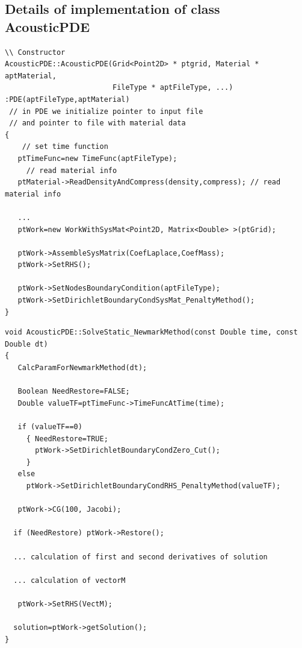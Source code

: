 \subsection { Details of implementation of class AcousticPDE}
\hrulefill
\begin{small}
\begin{verbatim}
\\ Constructor
AcousticPDE::AcousticPDE(Grid<Point2D> * ptgrid, Material * aptMaterial,
                         FileType * aptFileType, ...)
:PDE(aptFileType,aptMaterial)
 // in PDE we initialize pointer to input file
 // and pointer to file with material data
{
    // set time function 
   ptTimeFunc=new TimeFunc(aptFileType); 
     // read material info
   ptMaterial->ReadDensityAndCompress(density,compress); // read material info
   
   ...
   ptWork=new WorkWithSysMat<Point2D, Matrix<Double> >(ptGrid);
 
   ptWork->AssembleSysMatrix(CoefLaplace,CoefMass);
   ptWork->SetRHS();
 
   ptWork->SetNodesBoundaryCondition(aptFileType);
   ptWork->SetDirichletBoundaryCondSysMat_PenaltyMethod();
}
\end{verbatim}
\end{small}
\hrulefill
\newslide
\newpage
\hrulefill
\begin{small}
\begin{verbatim}
void AcousticPDE::SolveStatic_NewmarkMethod(const Double time, const Double dt)
{
   CalcParamForNewmarkMethod(dt);  

   Boolean NeedRestore=FALSE;
   Double valueTF=ptTimeFunc->TimeFuncAtTime(time);
 
   if (valueTF==0)
     { NeedRestore=TRUE;
       ptWork->SetDirichletBoundaryCondZero_Cut();
     }
   else
     ptWork->SetDirichletBoundaryCondRHS_PenaltyMethod(valueTF);
 
   ptWork->CG(100, Jacobi);
 
  if (NeedRestore) ptWork->Restore();
 
  ... calculation of first and second derivatives of solution

  ... calculation of vectorM
 
   ptWork->SetRHS(VectM);

  solution=ptWork->getSolution();
}
\end{verbatim}
\end{small}
\hrulefill
\newpage
\newslide
